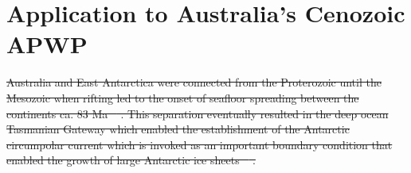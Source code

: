 \documentclass[11pt,letterpaper]{article}
\providecommand{\DIFdeltex}[1]{{\protect\color{red}\sout{#1}}}                      %
\providecommand{\DIFdelbegin}{} %
\providecommand{\DIFdel}[1]{\texorpdfstring{\DIFdeltex{#1}}{}} %
\newcommand{\DIFscaledelfig}{0.5}
\newlength{\DIFdelgraphicswidth} %
\newlength{\DIFdelgraphicsheight} %
\newcommand{\DIFdelincludegraphics}[2][]{%
\sbox{\DIFdelgraphicsbox}{\DIFOincludegraphics[#1]{#2}}%
\settoboxwidth{\DIFdelgraphicswidth}{\DIFdelgraphicsbox} %
\settoboxtotalheight{\DIFdelgraphicsheight}{\DIFdelgraphicsbox} %
\scalebox{\DIFscaledelfig}{%
\parbox[b]{\DIFdelgraphicswidth}{\usebox{\DIFdelgraphicsbox}\\[-\baselineskip] \rule{\DIFdelgraphicswidth}{0em}}\llap{\resizebox{\DIFdelgraphicswidth}{\DIFdelgraphicsheight}{%
\setlength{\unitlength}{\DIFdelgraphicswidth}%
\begin{picture}(1,1)%
\thicklines\linethickness{2pt} %
{\color[rgb]{1,0,0}\put(0,0){\framebox(1,1){}}}%
{\color[rgb]{1,0,0}\put(0,0){\line( 1,1){1}}}%
{\color[rgb]{1,0,0}\put(0,1){\line(1,-1){1}}}%
\end{picture}%
}\hspace*{3pt}}} %
} %
\DeclareRobustCommand{\DIFdelbegin}{\DIFOdelbegin \let\includegraphics\DIFdelincludegraphics} %
\begin{document}
\section*{Application to Australia's Cenozoic APWP}
\label{sec:australia}

\DIFdelbegin \DIFdel{Australia and East Antarctica were connected from the Proterozoic until the Mesozoic when rifting led to the onset of seafloor spreading between the continents ca. 83 Ma \mbox{%
\citep{Williams2011a, Veevers2012a}}\hspace{0pt}%
. This separation eventually resulted in the deep ocean Tasmanian Gateway which enabled the establishment of the Antarctic circumpolar current which is invoked as an important boundary condition that enabled the growth of large Antarctic ice sheets \mbox{%
\citep{Stickley2004a}}\hspace{0pt}%
. 
}%
\end{document}
